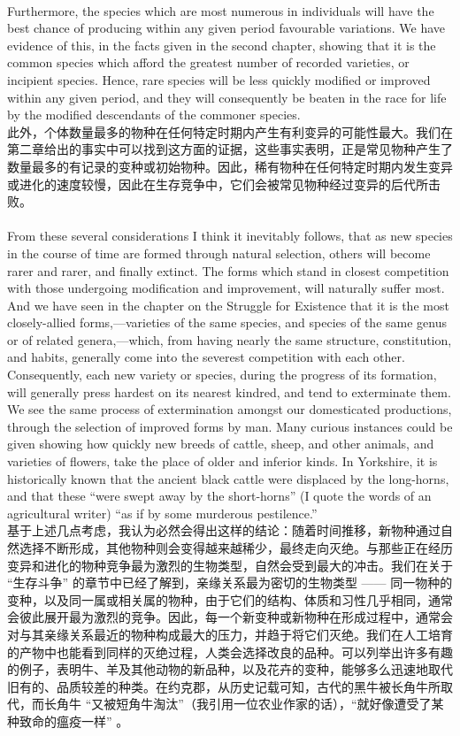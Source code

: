 \documentclass{article}
\begin{document}
\\
Furthermore, the species which are most numerous in individuals will have the best chance of producing within any given period favourable variations. We have evidence of this, in the facts given in the second chapter, showing that it is the common species which afford the greatest number of recorded varieties, or incipient species. Hence, rare species will be less quickly modified or improved within any given period, and they will consequently be beaten in the race for life by the modified descendants of the commoner species.\\
此外，个体数量最多的物种在任何特定时期内产生有利变异的可能性最大。我们在第二章给出的事实中可以找到这方面的证据，这些事实表明，正是常见物种产生了数量最多的有记录的变种或初始物种。因此，稀有物种在任何特定时期内发生变异或进化的速度较慢，因此在生存竞争中，它们会被常见物种经过变异的后代所击败。 \\

\\
From these several considerations I think it inevitably follows, that as new species in the course of time are formed through natural selection, others will become rarer and rarer, and finally extinct. The forms which stand in closest competition with those undergoing modification and improvement, will naturally suffer most. And we have seen in the chapter on the Struggle for Existence that it is the most closely-allied forms,—varieties of the same species, and species of the same genus or of related genera,—which, from having nearly the same structure, constitution, and habits, generally come into the severest competition with each other. Consequently, each new variety or species, during the progress of its formation, will generally press hardest on its nearest kindred, and tend to exterminate them. We see the same process of extermination amongst our domesticated productions, through the selection of improved forms by man. Many curious instances could be given showing how quickly new breeds of cattle, sheep, and other animals, and varieties of flowers, take the place of older and inferior kinds. In Yorkshire, it is historically known that the ancient black cattle were displaced by the long-horns, and that these “were swept away by the short-horns” (I quote the words of an agricultural writer) “as if by some murderous pestilence.”\\
基于上述几点考虑，我认为必然会得出这样的结论：随着时间推移，新物种通过自然选择不断形成，其他物种则会变得越来越稀少，最终走向灭绝。与那些正在经历变异和进化的物种竞争最为激烈的生物类型，自然会受到最大的冲击。我们在关于 “生存斗争” 的章节中已经了解到，亲缘关系最为密切的生物类型 —— 同一物种的变种，以及同一属或相关属的物种，由于它们的结构、体质和习性几乎相同，通常会彼此展开最为激烈的竞争。因此，每一个新变种或新物种在形成过程中，通常会对与其亲缘关系最近的物种构成最大的压力，并趋于将它们灭绝。我们在人工培育的产物中也能看到同样的灭绝过程，人类会选择改良的品种。可以列举出许多有趣的例子，表明牛、羊及其他动物的新品种，以及花卉的变种，能够多么迅速地取代旧有的、品质较差的种类。在约克郡，从历史记载可知，古代的黑牛被长角牛所取代，而长角牛 “又被短角牛淘汰”（我引用一位农业作家的话），“就好像遭受了某种致命的瘟疫一样” 。 \\
\end{document}
